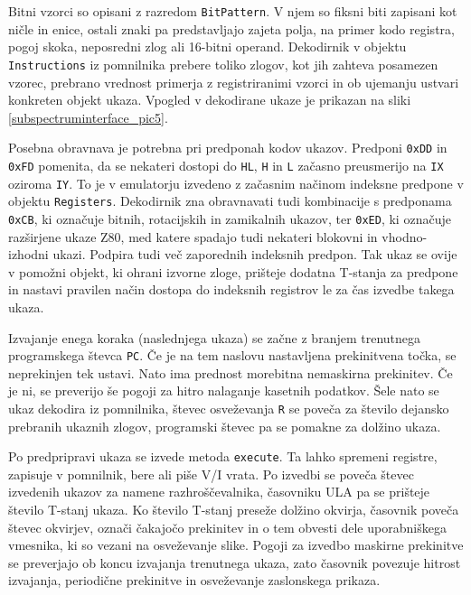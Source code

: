 \documentclass[a4paper, 12pt, openright]{book}
\begin{document}
    Bitni vzorci so opisani z razredom \texttt{BitPattern}. V njem so fiksni biti
    zapisani kot ničle in enice, ostali znaki pa predstavljajo zajeta polja, na primer
    kodo registra, pogoj skoka, neposredni zlog ali 16-bitni operand. Dekodirnik
    v objektu \texttt{Instructions} iz pomnilnika prebere toliko zlogov, kot jih
    zahteva posamezen vzorec, prebrano vrednost primerja z registriranimi vzorci in
    ob ujemanju ustvari konkreten objekt ukaza. Vpogled v dekodirane ukaze je
    prikazan na sliki \ref{subspectruminterface_pic5}.

    Posebna obravnava je potrebna pri predponah kodov ukazov. Predponi \texttt{0xDD}
    in \texttt{0xFD} pomenita, da se nekateri dostopi do \texttt{HL}, \texttt{H} in
    \texttt{L} začasno preusmerijo na \texttt{IX} oziroma \texttt{IY}. To je v emulatorju
    izvedeno z začasnim načinom indeksne predpone v objektu \texttt{Registers}. Dekodirnik
    zna obravnavati tudi kombinacije s predponama \texttt{0xCB}, ki označuje bitnih,
    rotacijskih in zamikalnih ukazov, ter \texttt{0xED}, ki označuje razširjene ukaze
    Z80, med katere spadajo tudi nekateri blokovni in vhodno-izhodni ukazi. Podpira
    tudi več zaporednih indeksnih predpon. Tak ukaz se ovije v pomožni objekt, ki
    ohrani izvorne zloge, prišteje dodatna T-stanja za predpone in nastavi
    pravilen način dostopa do indeksnih registrov le za čas izvedbe takega ukaza.

    Izvajanje enega koraka (naslednjega ukaza) se začne z branjem trenutnega
    programskega števca \texttt{PC}. Če je na tem naslovu nastavljena
    prekinitvena točka, se neprekinjen tek ustavi. Nato ima prednost morebitna
    nemaskirna prekinitev. Če je ni, se preverijo še pogoji za hitro nalaganje
    kasetnih podatkov. Šele nato se ukaz dekodira iz pomnilnika, števec
    osveževanja \texttt{R} se poveča za število dejansko prebranih ukaznih zlogov,
    programski števec pa se pomakne za dolžino ukaza.

    Po predpripravi ukaza se izvede metoda \texttt{execute}. Ta lahko spremeni
    registre, zapisuje v pomnilnik, bere ali piše V/I vrata. Po izvedbi se poveča
    števec izvedenih ukazov za namene razhroščevalnika, časovniku ULA pa se
    prišteje število T-stanj ukaza. Ko število T-stanj preseže dolžino okvirja,
    časovnik poveča števec okvirjev, označi čakajočo prekinitev in o tem obvesti dele
    uporabniškega vmesnika, ki so vezani na osveževanje slike. Pogoji za izvedbo maskirne
    prekinitve se preverjajo ob koncu izvajanja trenutnega ukaza, zato časovnik
    povezuje hitrost izvajanja, periodične prekinitve in osveževanje zaslonskega prikaza.
\end{document}
